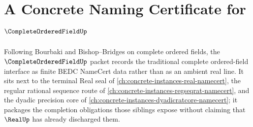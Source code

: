 \chapter{A Concrete Naming Certificate for $\CompleteOrderedFieldUp$}
\label{ch:concrete-instances-complete-ordered-field-namecert}

Following Bourbaki and Bishop--Bridges on complete ordered fields, the $\CompleteOrderedFieldUp$ packet records the traditional complete ordered-field interface as finite BEDC NameCert data rather than as an ambient real line. It sits next to the terminal Real seal of \autoref{ch:concrete-instances-real-namecert}, the regular rational sequence route of \autoref{ch:concrete-instances-regseqrat-namecert}, and the dyadic precision core of \autoref{ch:concrete-instances-dyadicratcore-namecert}; it packages the completion obligations those siblings expose without claiming that $\RealUp$ has already discharged them.

